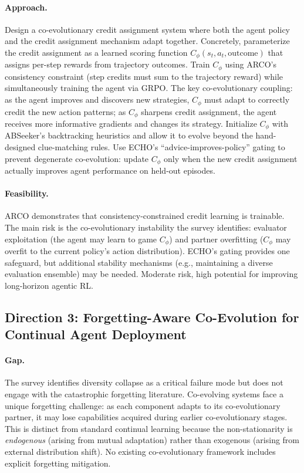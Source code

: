 \documentclass[11pt,a4paper]{article}
\begin{document}
\paragraph{Approach.} Design a co-evolutionary credit assignment system where both the agent policy and the credit assignment mechanism adapt together. Concretely, parameterize the credit assignment as a learned scoring function $C_\phi(s_t, a_t, \text{outcome})$ that assigns per-step rewards from trajectory outcomes. Train $C_\phi$ using ARCO's consistency constraint (step credits must sum to the trajectory reward) while simultaneously training the agent via GRPO. The key co-evolutionary coupling: as the agent improves and discovers new strategies, $C_\phi$ must adapt to correctly credit the new action patterns; as $C_\phi$ sharpens credit assignment, the agent receives more informative gradients and changes its strategy. Initialize $C_\phi$ with ABSeeker's backtracking heuristics and allow it to evolve beyond the hand-designed clue-matching rules. Use ECHO's ``advice-improves-policy'' gating to prevent degenerate co-evolution: update $C_\phi$ only when the new credit assignment actually improves agent performance on held-out episodes.

\paragraph{Feasibility.} ARCO demonstrates that consistency-constrained credit learning is trainable. The main risk is the co-evolutionary instability the survey identifies: evaluator exploitation (the agent may learn to game $C_\phi$) and partner overfitting ($C_\phi$ may overfit to the current policy's action distribution). ECHO's gating provides one safeguard, but additional stability mechanisms (e.g., maintaining a diverse evaluation ensemble) may be needed. Moderate risk, high potential for improving long-horizon agentic RL.

\subsection{Direction 3: Forgetting-Aware Co-Evolution for Continual Agent Deployment}

\paragraph{Gap.} The survey identifies diversity collapse as a critical failure mode but does not engage with the catastrophic forgetting literature. Co-evolving systems face a unique forgetting challenge: as each component adapts to its co-evolutionary partner, it may lose capabilities acquired during earlier co-evolutionary stages. This is distinct from standard continual learning because the non-stationarity is \emph{endogenous} (arising from mutual adaptation) rather than exogenous (arising from external distribution shift). No existing co-evolutionary framework includes explicit forgetting mitigation.
\end{document}
